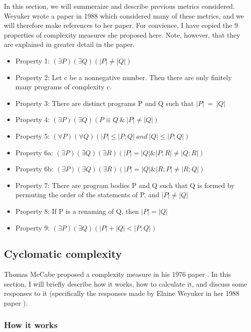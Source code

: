 \documentclass[]{article}
\begin{document}

In this section, we will summeraize and describe previous metrics considered.
Weyuker wrote a paper in 1988\cite{ref:evaluating_software_complexity_measures} which considered many of these metrics, and we will therefore make references to her paper.
For convience, I have copied the 9 properties of complexity measures she proposed here. 
Note, however, that they are explained in greater detail in the paper.

\begin{itemize}
	\item Property 1: $(\exists P)(\exists Q)(|P|\neq |Q|)$
	\item Property 2: Let c be a nonnegative number. Then there
are only finitely many programs of complexity c.
	\item Property 3: There are distinct programs P and Q such
that $|P| ~= ~|Q|$
	\item Property 4: $(\exists P)(\exists Q)(P \equiv Q ~\& ~|P| \neq |Q|)$
	\item Property 5: $(\forall P)(\forall Q)(|P| \leq |P; Q| ~and ~|Q| \leq |P; Q|)$
	\item Property 6a: $(\exists P)(\exists Q)(\exists R)(|P| = |Q| \& |P;R| \neq |Q; R|)$
	\item Property 6b: $(\exists P)(\exists Q)(\exists R)(|P| = |Q| \& |R;P| \neq |R; Q|)$
	\item Property 7: There are program bodies P and Q such that Q is formed by permuting the order of the statements of P, and $|P| \neq |Q|$
	\item Property 8: If P is a renaming of Q, then $|P| = |Q|$
	\item Property 9: $(\exists P)(\exists Q)(|P|+|Q| < |P; Q|)$
\end{itemize}

\subsection{Cyclomatic complexity}

Thomas McCabe proposed a complexity measure in his 1976 paper \cite{ref:a_complexity_measure}.
In this section, I will briefly describe how it works, how to calculate it, and discuss some responses to it (specifically the responses made by  Elaine Weyuker in her 1988 paper \cite{ref:evaluating_software_complexity_measures}).

\subsubsection{How it works}
\end{document}
